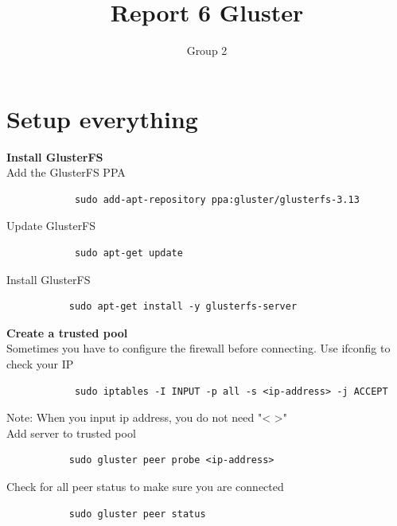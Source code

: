 \documentclass[12pt]{article}
\title{Report 6 Gluster}
\author{Group 2}
\begin{document}
\maketitle
  \section{Setup everything}
    \textbf{\large Install GlusterFS}\\
        Add the GlusterFS PPA 
        \begin{verbatim}
            sudo add-apt-repository ppa:gluster/glusterfs-3.13
        \end{verbatim}
        Update GlusterFS
        \begin{verbatim}
            sudo apt-get update
        \end{verbatim}
        Install GlusterFS
        \begin{verbatim}
           sudo apt-get install -y glusterfs-server
        \end{verbatim}
        
     \textbf{\large Create a trusted pool}\\
        Sometimes you have to configure the firewall before connecting. Use ifconfig to check your IP\\
        \begin{verbatim}
            sudo iptables -I INPUT -p all -s <ip-address> -j ACCEPT
        \end{verbatim}
            Note: When you input ip address, you do not need "< >" \\
            Add server to trusted pool
        \begin{verbatim}
           sudo gluster peer probe <ip-address>
        \end{verbatim}
        Check for all peer status to make sure you are connected
        \begin{verbatim}
           sudo gluster peer status
        \end{verbatim}   
        
\end{document}
